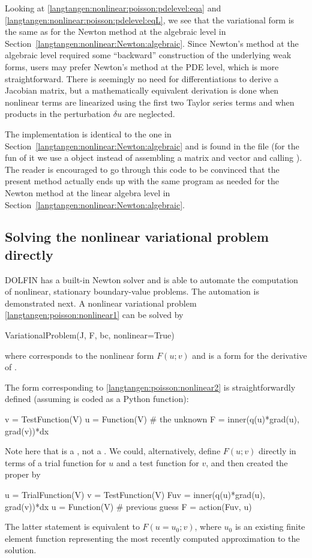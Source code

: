 Looking at \eqref{langtangen:nonlinear:poisson:pdelevel:eqa} and
\eqref{langtangen:nonlinear:poisson:pdelevel:eqL}, we see that the variational
form is the same as for the Newton method at the algebraic level
in Section~\ref{langtangen:nonlinear:Newton:algebraic}. Since Newton's method
at the algebraic level required some ``backward'' construction of the
underlying weak forms, \fenics{} users may prefer Newton's method at
the PDE level, which is more straightforward.
There is seemingly no need for differentiations to derive
a Jacobian matrix,
but a mathematically equivalent derivation is done when nonlinear terms are
linearized using the first two Taylor series terms and when
products in the perturbation $\delta u$ are neglected.

The implementation is identical to the one in
Section~\ref{langtangen:nonlinear:Newton:algebraic} and is found in
the file  (for the fun of it we use
a  object instead of assembling a matrix and
vector and calling ). The reader is encouraged to go
through this code to be convinced that the present method actually
ends up with the same program as needed for the Newton method at
the linear algebra level in Section~\ref{langtangen:nonlinear:Newton:algebraic}.

\subsection{Solving the nonlinear variational problem directly}
\label{langtangen:nonlinear:Newton:auto}

DOLFIN has a built-in Newton solver and is able to automate the
computation of nonlinear, stationary boundary-value problems.
The automation is demonstrated next. A nonlinear variational
problem \eqref{langtangen:poisson:nonlinear1} can be solved by
\begin{python}
VariationalProblem(J, F, bc, nonlinear=True)
\end{python}
where  corresponds to the nonlinear form $F(u;v)$ and
 is a form for the derivative of .

The  form corresponding to \eqref{langtangen:poisson:nonlinear2}
is straightforwardly defined (assuming  is
coded as a Python function):
\begin{python}
v = TestFunction(V)
u = Function(V)  # the unknown
F = inner(q(u)*grad(u), grad(v))*dx
\end{python}
Note here that  is a , not a .
We could, alternatively, define $F(u;v)$ directly in terms of
a trial function for $u$ and a test function for $v$, and then
created the proper  by
\begin{python}
u = TrialFunction(V)
v = TestFunction(V)
Fuv = inner(q(u)*grad(u), grad(v))*dx
u = Function(V)  # previous guess
F = action(Fuv, u)
\end{python}
The latter statement is equivalent to $F(u=u_0; v)$, where $u_0$ is
an existing finite element function representing the most recently
computed approximation to the solution.

